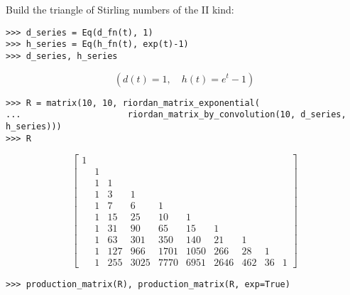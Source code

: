 \begin{example}
Build the triangle of Stirling numbers of the II kind:
\begin{verbatim}
>>> d_series = Eq(d_fn(t), 1)
>>> h_series = Eq(h_fn(t), exp(t)-1)
>>> d_series, h_series
\end{verbatim}
\begin{displaymath}
\left ( d{\left (t \right )} = 1, \quad h{\left (t \right )} = e^{t} - 1\right )
\end{displaymath}
\begin{verbatim}
>>> R = matrix(10, 10, riordan_matrix_exponential(
...                     riordan_matrix_by_convolution(10, d_series, h_series)))
>>> R
\end{verbatim}
\begin{displaymath}
\left[\begin{matrix}1 &   &   &   &   &   &   &   &   &  \\  & 1 &   &   &   &   &   &   &   &  \\  & 1 & 1 &   &   &   &   &   &   &  \\  & 1 & 3 & 1 &   &   &   &   &   &  \\  & 1 & 7 & 6 & 1 &   &   &   &   &  \\  & 1 & 15 & 25 & 10 & 1 &   &   &   &  \\  & 1 & 31 & 90 & 65 & 15 & 1 &   &   &  \\  & 1 & 63 & 301 & 350 & 140 & 21 & 1 &   &  \\  & 1 & 127 & 966 & 1701 & 1050 & 266 & 28 & 1 &  \\  & 1 & 255 & 3025 & 7770 & 6951 & 2646 & 462 & 36 & 1\end{matrix}\right]
\end{displaymath}
\begin{verbatim}
>>> production_matrix(R), production_matrix(R, exp=True)
\end{verbatim}
\begin{displaymath}

\end{displaymath}
\end{example}
